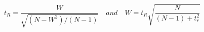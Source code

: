 \begin{equation}
	t_R = \frac{W}{\sqrt{(N-W^2)/(N-1)}} \quad and \quad W=t_R \sqrt{\frac{N}{(N-1)+t_r^2}}
\end{equation}



%
%
%
%
%
%
%
%
%
%
%
%
%
%
%




